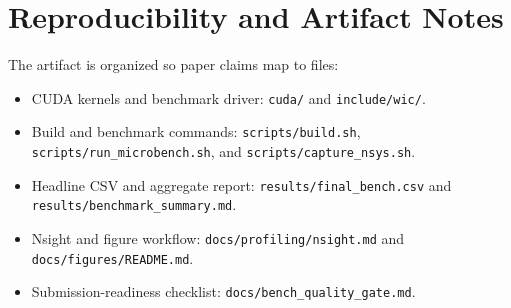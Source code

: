 \documentclass[11pt]{article}
\begin{document}
\section*{Reproducibility and Artifact Notes}
The artifact is organized so paper claims map to files:
\begin{itemize}[leftmargin=1.5em]
  \item CUDA kernels and benchmark driver: \texttt{cuda/} and \texttt{include/wic/}.
  \item Build and benchmark commands: \texttt{scripts/build.sh}, \texttt{scripts/run\_microbench.sh}, and \texttt{scripts/capture\_nsys.sh}.
  \item Headline CSV and aggregate report: \texttt{results/final\_bench.csv} and \texttt{results/benchmark\_summary.md}.
  \item Nsight and figure workflow: \texttt{docs/profiling/nsight.md} and \texttt{docs/figures/README.md}.
  \item Submission-readiness checklist: \texttt{docs/bench\_quality\_gate.md}.
\end{itemize}



\end{document}
